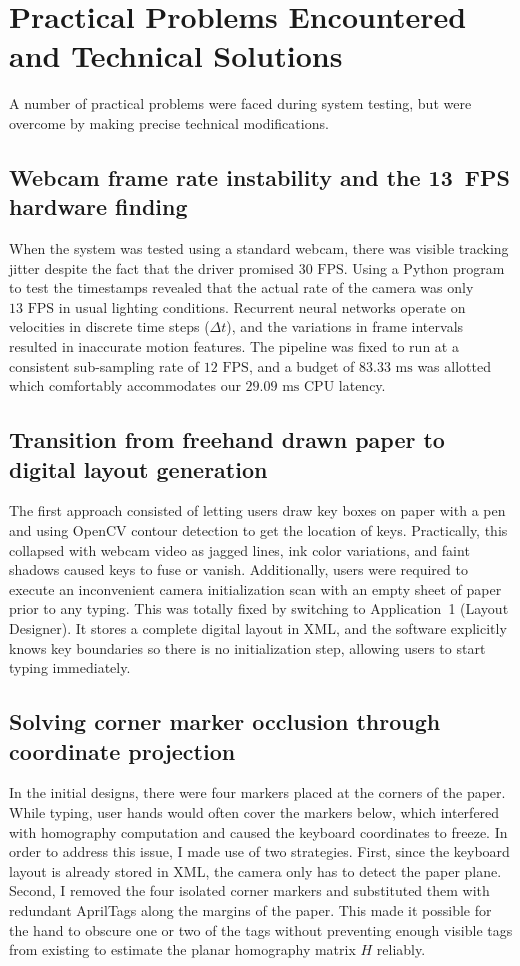 \section{Practical Problems Encountered and Technical Solutions}
\label{sec:concl_problems}
A number of practical problems were faced during system testing, but were overcome by making precise technical modifications.

\subsection{Webcam frame rate instability and the 13~FPS hardware finding}
\label{subsec:concl_prob_fps}
When the system was tested using a standard webcam, there was visible tracking jitter despite the fact that the driver promised $30\text{ FPS}$. Using a Python program to test the timestamps revealed that the actual rate of the camera was only $13\text{ FPS}$ in usual lighting conditions. Recurrent neural networks operate on velocities in discrete time steps ($\Delta t$), and the variations in frame intervals resulted in inaccurate motion features. The pipeline was fixed to run at a consistent sub-sampling rate of $12\text{ FPS}$, and a budget of $83.33\text{ ms}$ was allotted which comfortably accommodates our $29.09\text{ ms}$ CPU latency.

\subsection{Transition from freehand drawn paper to digital layout generation}
\label{subsec:concl_prob_freehand}
The first approach consisted of letting users draw key boxes on paper with a pen and using OpenCV contour detection to get the location of keys. Practically, this collapsed with webcam video as jagged lines, ink color variations, and faint shadows caused keys to fuse or vanish. Additionally, users were required to execute an inconvenient camera initialization scan with an empty sheet of paper prior to any typing. This was totally fixed by switching to Application~1 (Layout Designer). It stores a complete digital layout in XML, and the software explicitly knows key boundaries so there is no initialization step, allowing users to start typing immediately.

\subsection{Solving corner marker occlusion through coordinate projection}
\label{subsec:concl_prob_markers}
In the initial designs, there were four markers placed at the corners of the paper. While typing, user hands would often cover the markers below, which interfered with homography computation and caused the keyboard coordinates to freeze. In order to address this issue, I made use of two strategies. First, since the keyboard layout is already stored in XML, the camera only has to detect the paper plane. Second, I removed the four isolated corner markers and substituted them with redundant AprilTags along the margins of the paper. This made it possible for the hand to obscure one or two of the tags without preventing enough visible tags from existing to estimate the planar homography matrix $H$ reliably.

